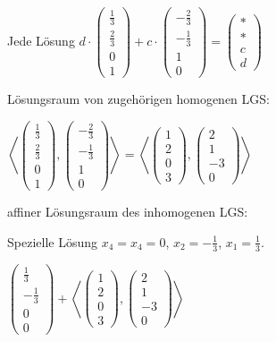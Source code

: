 \documentclass[a4paper, openany]{book}
\begin{document}
    Jede Lösung $d \cdot \begin{pmatrix} \frac{1}{3} \\ \frac{2}{3} \\ 0 \\ 1 \end{pmatrix} + c \cdot \begin{pmatrix}- \frac{2}{3} \\ - \frac{1}{3} \\ 1 \\ 0 \end{pmatrix} = \begin{pmatrix}* \\ * \\ c \\ d \end{pmatrix}$

    \par \medskip

    Lösungsraum von zugehörigen homogenen LGS: 

    $\left \langle \begin{pmatrix} \frac{1}{3} \\ \frac{2}{3} \\ 0 \\ 1 \end{pmatrix}, \begin{pmatrix}- \frac{2}{3} \\ - \frac{1}{3} \\ 1 \\ 0 \end{pmatrix} \right \rangle = \left \langle \begin{pmatrix}1 \\ 2 \\ 0 \\ 3 \end{pmatrix}, \begin{pmatrix}2 \\ 1 \\ -3 \\ 0 \end{pmatrix} \right \rangle$

    \par \medskip

    affiner Lösungsraum des inhomogenen LGS:

    Spezielle Lösung $x_4 = x_4 = 0$, $x_2 = - \frac{1}{3}$, $x_1 = \frac{1}{3}$.

    $\begin{pmatrix}\frac{1}{3} \\ - \frac{1}{3} \\ 0 \\ 0 \end{pmatrix} +  \left \langle \begin{pmatrix}1 \\ 2 \\ 0 \\ 3 \end{pmatrix}, \begin{pmatrix}2 \\ 1 \\ -3 \\ 0 \end{pmatrix} \right \rangle$
\end{document}
